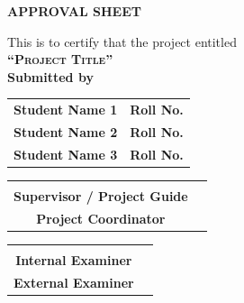 
\begin{center}

{\LARGE\bf APPROVAL SHEET}

\vspace{1cm}

{\large This is to certify that the project entitled}\\[0.3cm]

{\Large\bf \textsc{``Project Title''}}\\[0.3cm]

{\large\bf Submitted by}\\[0.5cm]

\begin{table}[h]
\centering
\Large
\begin{tabular}{cc}
\textbf{Student Name 1} & \textbf{Roll No.} \\
\textbf{Student Name 2} & \textbf{Roll No.} \\
\textbf{Student Name 3} & \textbf{Roll No.}
\end{tabular}
\end{table}

\vspace{2cm}


\begin{tabular}{cc}
\begin{minipage}{0.42\textwidth}
\centering
\rule{5cm}{0.2px}\\
\textbf{Supervisor / Project Guide}
\end{minipage}
&
\begin{minipage}{0.42\textwidth}
\centering
\rule{5cm}{0.2px}\\
\textbf{Project Coordinator}
\end{minipage}
\end{tabular}

\vspace{2.2cm}


\begin{tabular}{cc}
\begin{minipage}{0.42\textwidth}
\centering
\rule{5cm}{0.2px}\\
\textbf{Internal Examiner}
\end{minipage}
&
\begin{minipage}{0.42\textwidth}
\centering
\rule{5cm}{0.2px}\\
\textbf{External Examiner}
\end{minipage}
\end{tabular}


\end{center}
